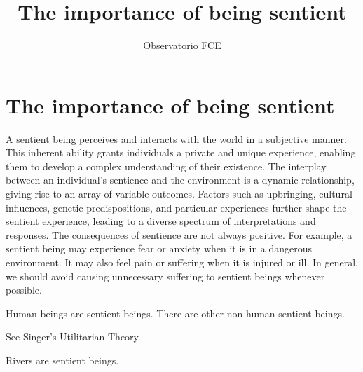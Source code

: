 \documentclass[10pt,a4paper]{article}
\author{Observatorio FCE}
\title{The importance of being sentient}
\begin{document}
	\section{The importance of being sentient}
	
	A sentient being perceives and interacts with the world in a subjective manner. This inherent ability grants individuals a private and unique experience, enabling them to develop a complex understanding of their existence. The interplay between an individual's sentience and the environment is a dynamic relationship, giving rise to an array of variable outcomes. Factors such as upbringing, cultural influences, genetic predispositions, and particular experiences further shape the sentient experience, leading to a diverse spectrum of interpretations and responses.
	The consequences of sentience are not always positive. For example, a sentient being may experience fear or anxiety when it is in a dangerous environment. It may also feel pain or suffering when it is injured or ill. In general, we should avoid causing unnecessary suffering to sentient beings whenever possible. 
	
	Human beings are sentient beings. There are other non human sentient beings. 
	
	See Singer's Utilitarian Theory.
	
	Rivers are sentient beings.
	
	
	
\end{document}
